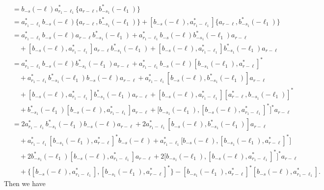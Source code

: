 \documentclass[sn-mathphys, Numbered ,a4paper]{sn-jnl}%
\theoremstyle{plain}
\theoremstyle{definition}
\theoremstyle{remark}
\theoremstyle{plain}
\theoremstyle{definition}
\theoremstyle{remark}
\begin{document}
\begin{align}
    &= 
    b_{-s}(-\ell)a^*_{  r_1-\ell_1}\{a_{ r-\ell}, b^*_{-s_1}(-\ell_1)\}\nonumber\\
    &= a^*_{  r_1-\ell_1}b_{-s}(-\ell)\{a_{ r-\ell}, b^*_{-s_1}(-\ell_1)\} + [b_{-s}(-\ell),a^*_{  r_1-\ell_1}]\{a_{ r-\ell}, b^*_{-s_1}(-\ell_1)\} \nonumber\\
    &= a^*_{  r_1-\ell_1}b_{-s}(-\ell)a_{ r-\ell} b^*_{-s_1}(-\ell_1) + a^*_{  r_1-\ell_1}b_{-s}(-\ell)b^*_{-s_1}(-\ell_1)a_{ r-\ell}\nonumber\\ &\quad + [b_{-s}(-\ell),a^*_{  r_1-\ell_1}]a_{ r-\ell}b^*_{-s_1}(-\ell_1) +[b_{-s}(-\ell),a^*_{r_1-\ell_1}] b^*_{-s_1}(-\ell_1)a_{ r-\ell}\nonumber\\
    &= a^*_{  r_1-\ell_1}b_{-s}(-\ell)b^*_{-s_1}(-\ell_1)a_{ r-\ell} + a^*_{  r_1-\ell_1}b_{-s}(-\ell)[ b_{-s_1}(-\ell_1), a^*_{ r-\ell}]^*  \nonumber\\ 
    &\quad + a^*_{  r_1-\ell_1}b^*_{-s_1}(-\ell_1)b_{-s}(-\ell)a_{ r-\ell} +a^*_{  r_1-\ell_1}[b_{-s}(-\ell),b^*_{-s_1}(-\ell_1)]a_{ r-\ell}\nonumber\\ &\quad + [b_{-s}(-\ell),a^*_{  r_1-\ell_1}]b^*_{-s_1}(-\ell_1)a_{ r-\ell} + [b_{-s}(-\ell),a^*_{  r_1-\ell_1}][a^*_{ r-\ell}, b_{-s_1}(-\ell_1)]^*\nonumber\\ &\quad +b^*_{-s_1}(-\ell_1)[b_{-s}(-\ell),a^*_{  r_1-\ell_1}]a_{ r-\ell}+ \big[b_{-s_1}(-\ell_1),[b_{-s}(-\ell),a^*_{  r_1-\ell_1}]^*\big]^*a_{ r-\ell}\nonumber\\
    &= 2a^*_{  r_1-\ell_1}b^*_{-s_1}(-\ell_1)b_{-s}(-\ell)a_{ r-\ell} + 2a^*_{  r_1-\ell_1}[b_{-s}(-\ell),b^*_{-s_1}(-\ell_1)]a_{ r-\ell}\nonumber\\ 
    &\quad + a^*_{r_1-\ell_1}[b_{-s_1}(-\ell_1),a^*_{ r-\ell}]^*b_{-s}(-\ell) + a^*_{  r_1-\ell_1}\big[b_{-s}(-\ell),[b_{-s_1}(-\ell_1),a^*_{ r-\ell}]^*\big]\nonumber\\
    &\quad + 2b^*_{-s_1}(-\ell_1)[b_{-s}(-\ell),a^*_{  r_1-\ell_1}]a_{ r-\ell} +2\big[b_{-s_1}(-\ell_1),[b_{-s}(-\ell),a^*_{  r_1-\ell_1}]^*\big]^*a_{ r-\ell}\nonumber\\
    &\quad + \big\{ [b_{-s}(-\ell),a^*_{  r_1-\ell_1}],[b_{-s_1}(-\ell_1), a^*_{ r-\ell}]^* \big\} - [ b_{-s_1}(-\ell_1), a^*_{ r-\ell}]^* [b_{-s}(-\ell), a^*_{r_1-\ell_1}].
\end{align}
Then we have
\end{document}
